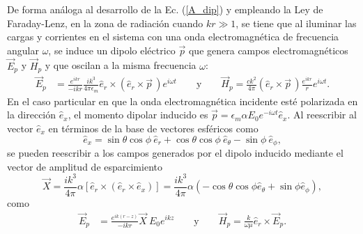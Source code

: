  De forma análoga al desarrollo de la Ec. (\ref{A_dip}) y empleando la Ley de Faraday-Lenz, en la zona de radiación cuando $kr\gg 1$, se tiene que al iluminar las cargas y corrientes en el sistema con una onda electromagnética de frecuencia angular $\omega$, se induce un dipolo eléctrico $\Vec{p}$ que genera campos electromagnéticos $\Vec{E}_p$ y $\Vec{H}_p$ y  que oscilan a la misma frecuencia $\omega$: 
\begin{align}
    \Vec{E}_p&=\frac{e^{ikr}}{-ikr}\frac{ik^3}{4\pi\epsilon_m}\hat{e}_r\times(\hat{e}_r\times \Vec{p}\,) e^{i\omega t}\qquad\text{y}\qquad
    \Vec{H}_p=\frac{ck^2}{4\pi}(\hat{e}_r\times\Vec{p}\,)\frac{e^{ikr}}{r}e^{i\omega t}.
\end{align}
En el caso particular en que la onda electromagnética incidente esté polarizada en la dirección $\hat{e}_x$, el momento dipolar inducido es $\Vec{p}=\epsilon_m \alpha E_0 e^{-i\omega t}\hat{e}_x$. Al reescribir al vector $\hat{e}_x$ en términos de la base de vectores esféricos como \cite{Griffiths}
\begin{equation}
	\hat{e}_x=\sin\theta\cos\phi\: \hat{e}_r+\cos\theta\cos\phi\: \hat{e}_{\theta}-\sin\phi \:\hat{e}_{\phi},
\end{equation}
se pueden reescribir a los campos generados por el dipolo inducido mediante el vector de amplitud de esparcimiento
\begin{equation}
	\Vec{X}=\frac{ik^3}{4\pi}\alpha \left[ \hat{e}_r\times(\hat{e}_r\times \hat{e}_x)\right]=\frac{ik^3}{4\pi}\alpha \left(-\cos\theta\cos\phi \hat{e}_{\theta}+\sin\phi \hat{e}_{\phi} \right),
	\label{Xvec}
\end{equation}
como \cite{Bohren}
 \begin{align}
 	\Vec{E}_{p}&=\frac{e^{ik(r-z)}}{-ikr}\Vec{X}\:E_0 e^{ikz}\qquad\text{y}\qquad
 	\Vec{H}_{p}=\frac{k}{\omega\mu}\hat{e}_r\times\Vec{E}_{p}.
 	\label{EH_s}
 \end{align}

